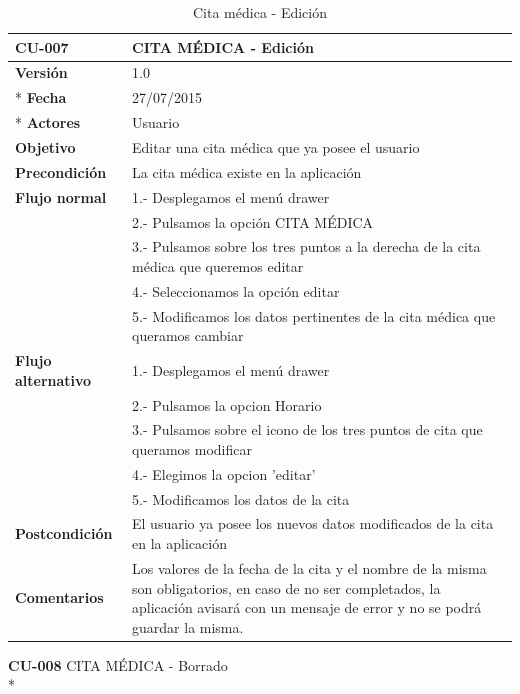 \documentclass[../pfc.tex]{subfiles}
\begin{document}
		\begin{table}[H]
			\centering
			\begin{tabular}[t]{|p{3cm}|p{9.5cm}|}
				\hline \textbf{CU-007} & \textbf{CITA MÉDICA - Edición} \\*
				\hline\hline \textbf{Versión} & 1.0 \\ *
				\hline\hline \textbf{Fecha} & 27/07/2015 \\ *
				\hline\textbf{Actores} 	& Usuario\\*
				\hline \textbf{Objetivo} & Editar una cita médica que ya posee el usuario\\* 			
				\hline \textbf{Precondición} & La cita médica existe en la aplicación\\* 
				\hline \textbf{Flujo normal} & 1.- Desplegamos el menú drawer \\* 
				& 2.- Pulsamos la opción CITA MÉDICA\\*	
				& 3.- Pulsamos sobre los tres puntos a la derecha de la cita médica que queremos editar\\*	
				& 4.- Seleccionamos la opción editar\\*	
				& 5.- Modificamos los datos pertinentes de la cita médica que queramos cambiar\\*	
				\hline \textbf{Flujo alternativo} & 1.- Desplegamos el menú drawer \\* 
				& 2.- Pulsamos la opcion Horario \\*	
				& 3.- Pulsamos sobre el icono de los tres puntos de cita que queramos modificar \\*	
				& 4.- Elegimos la opcion 'editar'\\*	
				& 5.- Modificamos los datos de la cita\\*	
				\hline \textbf{Postcondición} & El usuario ya posee los nuevos datos modificados de la cita en la aplicación \\* 
				\hline \textbf{Comentarios}   & Los valores de la fecha de la cita y el nombre de la misma son obligatorios, en caso de no ser completados, la aplicación avisará con un mensaje de error y no se podrá guardar la misma.\\*
				\hline
			\end{tabular}
			\caption{Cita médica - Edición}
			\label{tabla:caso007}
		\end{table}
	
	\textbf{CU-008}	CITA MÉDICA - Borrado\\*
	
\end{document}
